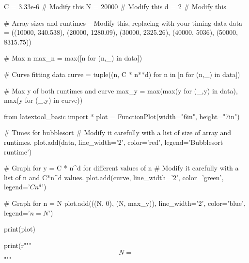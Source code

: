 \begin{python}
C = 3.33e-6                 # Modify this 
N = 20000                   # Modify this
d = 2                       # Modify this

# Array sizes and runtimes -- Modify this, replacing with your timing data
data = ((10000, 340.538), 
        (20000, 1280.09),
        (30000, 2325.26),
        (40000, 5036),
        (50000, 8315.75))

# Max n
max_n = max([n for (n,_) in data])

# Curve fitting data
curve = tuple((n, C * n**d) for n in [n for (n,_) in data])

# Max y of both runtimes and curve
max_y = max(max(y for (_,y) in data), max(y for (_,y) in curve))

from latextool_basic import *
plot = FunctionPlot(width="6in", height="7in")

# Times for bubblesort
# Modify it carefully with a list of size of array and runtimes.
plot.add(data, line_width='2', color='red', legend='Bubblesort runtime')

# Graph for y = C * n^d for different values of n
# Modify it carefully with a list of n and C*n^d values.
plot.add(curve,
         line_width='2', color='green', legend='$Cn^{d}$')

# Graph for n = N
plot.add(((N, 0),
          (N, max_y)),
          line_width='2', color='blue', legend='$n = N$')

print(plot)

print(r"""
\[
N = %
\]
""" %
\end{python}

